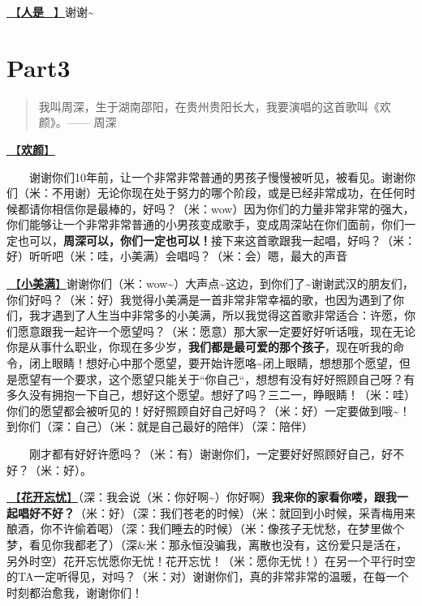 \documentclass[]{ctexbook}
\begin{document}
\hyperref[renshi]{🎵【\textbf{人是\_}】}谢谢\textasciitilde{}

\section{Part3}\label{wuhan-20240727-part3}

\begin{quote}
我叫周深，生于湖南邵阳，在贵州贵阳长大，我要演唱的这首歌叫《欢颜》。------ 周深
\end{quote}

\hyperref[happy-face]{🎵【\textbf{欢颜}】}

  谢谢你们10年前，让一个非常非常普通的男孩子慢慢被听见，被看见。谢谢你们（米：不用谢）无论你现在处于努力的哪个阶段，或是已经非常成功，在任何时候都请你相信你是最棒的，好吗？（米：wow）因为你们的力量非常非常的强大，你们能够让一个非常非常普通的小男孩变成歌手，变成周深站在你们面前，你们一定也可以，\textbf{周深可以，你们一定也可以！}接下来这首歌跟我一起唱，好吗？（米：好）听听吧（米：哇，小美满）会唱吗？（米：会）嗯，最大的声音

\hyperref[happy-ending]{🎵【\textbf{小美满}】}谢谢你们（米：wow\textasciitilde）大声点\textasciitilde 这边，到你们了\textasciitilde 谢谢武汉的朋友们，你们好吗？（米：好）我觉得小美满是一首非常非常幸福的歌，也因为遇到了你们，我才遇到了人生当中非常多的小美满，所以我觉得这首歌非常适合：许愿，你们愿意跟我一起许一个愿望吗？（米：愿意）那大家一定要好好听话哦，现在无论你是从事什么职业，你现在多少岁，\textbf{我们都是最可爱的那个孩子}，现在听我的命令，闭上眼睛！想好心中那个愿望，要开始许愿咯\textasciitilde 闭上眼睛，想想那个愿望，但是愿望有一个要求，这个愿望只能关于``你自己``，想想有没有好好照顾自己呀？有多久没有拥抱一下自己，想好这个愿望。想好了吗？三二一，睁眼睛！（米：哇）你们的愿望都会被听见的！好好照顾自好自己好吗？（米：好）一定要做到哦\textasciitilde！到你们（深：自己）（米：就是自己最好的陪伴）（深：陪伴）

  刚才都有好好许愿吗？（米：有）谢谢你们，一定要好好照顾好自己，好不好？（米：好）。

\hyperref[no-worries]{🎵【\textbf{花开忘忧}】}（深：我会说（米：你好啊\textasciitilde）你好啊）\textbf{我来你的家看你喽，跟我一起唱好不好？}（米：好）（深：我们苍老的时候）（米：就回到小时候，采青梅用来酿酒，你不许偷着喝）（深：我们睡去的时候）（米：像孩子无忧愁，在梦里做个梦，看见你我都老了）（深\&米：那永恒没骗我，离散也没有，这份爱只是活在，另外时空）花开忘忧愿你无忧！花开忘忧！（米：愿你无忧！）在另一个平行时空的TA一定听得见，对吗？（米：对）谢谢你们，真的非常非常的温暖，在每一个时刻都治愈我，谢谢你们！
\end{document}
